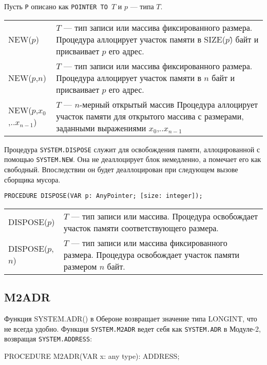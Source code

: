 Пусть \verb|P| описано как \mbox{{\tt POINTER TO} $T$} и
$p$ --- типа $T$.
\begin{center}
\begin{tabular}{lp{7.5cm}}
NEW($p$)       &  $T$ --- тип записи или массива фиксированного размера.
Процедура аллоцирует участок памяти в SIZE($p$\^) байт и присваивает
$p$ его адрес.          \\

NEW($p$,$n$)   &  $T$ --- тип записи или массива фиксированного размера.
Процедура аллоцирует участок памяти в $n$ байт и присваивает
$p$ его адрес.          \\
NEW($p$,$x_0$,..$x_{n-1}$) & $T$ --- $n$-мерный открытый массив
Процедура аллоцирует участок памяти для открытого массива с размерами,
заданными выражениями $x_0$,..$x_{n-1}$     \\
\end{tabular}
\end{center}

Процедура {\tt SYSTEM.DISPOSE} служит для освобождения памяти,
аллоцированной с помощью {\tt SYSTEM.NEW}.
Она не деаллоцирует блок немедленно, а помечает его как свободный.
Впоследствии он будет деаллоцирован при следующем вызове сборщика мусора.

{\small
\begin{verbatim}
PROCEDURE DISPOSE(VAR p: AnyPointer; [size: integer]);
\end{verbatim}
}

\begin{center}
\begin{tabular}{lp{7.5cm}}
DISPOSE($p$)    & $T$ --- тип записи или массива.
Процедура освобождает участок памяти соответствующего размера. \\
DISPOSE($p$,$n$) & $T$ --- тип записи или массива фиксированного размера.
Процедура освобождает участок памяти размером $n$ байт. \\
\end{tabular}
\end{center}

\subsection{M2ADR}\label{o2:system:m2adr}

Функция SYSTEM.ADR() в Обероне возвращает значение типа LONGINT,
что не всегда удобно.
Функция {\tt SYSTEM.M2ADR} ведет себя как
{\tt SYSTEM.ADR} в Модуле-2, возвращая {\tt SYSTEM.ADDRESS}:  %

PROCEDURE M2ADR(VAR x: any type): ADDRESS;



